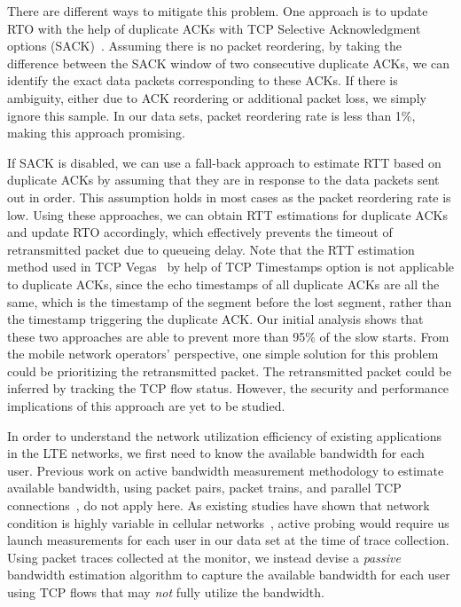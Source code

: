 There are different ways to mitigate this problem. One approach is to update RTO with the help of duplicate ACKs with TCP Selective Acknowledgment options (SACK)~\cite{rfc2018}. Assuming there is no packet reordering, by taking the difference between the SACK window of two consecutive duplicate ACKs, we can identify the exact data packets corresponding to these ACKs. If there is ambiguity, either due to ACK reordering or additional packet loss, we simply ignore this sample. In our data sets, packet reordering rate is less than 1\%, making this approach promising.

If SACK is disabled, we can use a fall-back approach to estimate RTT based on duplicate ACKs by assuming that they are in response to the data packets sent out in order. This assumption holds in most cases as the packet reordering rate is low. Using these approaches, we can obtain RTT estimations for duplicate ACKs and update RTO accordingly, which effectively prevents the timeout of retransmitted packet due to queueing delay. Note that the RTT estimation method used in TCP Vegas~\cite{tcp.vegas} by help of TCP Timestamps option is not applicable to duplicate ACKs, since the echo timestamps of all duplicate ACKs are all the same, which is the timestamp of the segment before the lost segment, rather than the timestamp triggering the duplicate ACK. Our initial analysis shows that these two approaches are able to prevent more than 95\% of the slow starts. From the mobile network operators' perspective, one simple solution for this problem could be prioritizing the retransmitted packet. The retransmitted packet could be inferred by tracking the TCP flow status. However, the security and performance implications of this approach are yet to be studied.



\label{sec:tcp.estimate}

In order to understand the network utilization efficiency of existing applications in the LTE networks, we first need to know the available bandwidth for each user. Previous work on active bandwidth measurement methodology to estimate available bandwidth, \eg using packet pairs, packet trains, and parallel TCP connections~\cite{prasad03, jain02, hu04}, do not apply here. As existing studies have shown that network condition is highly variable in cellular networks~\cite{mobisys.3gtest}, active probing would require us launch measurements for each user in our data set at the time of trace collection. Using packet traces collected at the monitor, we instead devise a \emph{passive} bandwidth estimation algorithm to capture the available bandwidth for each user using TCP flows that may \emph{not} fully utilize the bandwidth.

